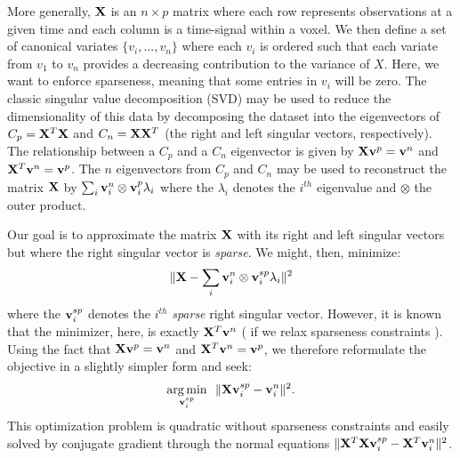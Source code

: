 \documentclass{llncs}
\newcommand{\X}{{\bf X}}
\newcommand{\vv}{{\bf v}}
\begin{document}
 
More generally, $\X$ is an $n \times p$ matrix where each row represents observations at a given time and each column is a time-signal within a voxel. We then define a set of canonical variates $\{ v_i,...,v_n\}$ where each $v_i$ is ordered such that each variate from $v_1$ to $v_n$ provides a decreasing contribution to the variance of $X$. Here, we want to enforce sparseness, meaning that some entries in $v_i$ will be zero. The classic singular value decomposition (SVD) may be used to reduce the dimensionality of this data by decomposing the dataset into the eigenvectors of $C_p = \X^T\X$ and $C_n = \X\X^T$ (the right and left singular vectors, respectively).  The relationship between a $C_p$ and a $C_n$ eigenvector is given by $\X \vv^p = \vv^n$ and $\X^T \vv^n = \vv^p$.  The $n$ eigenvectors from $C_p$ and $C_n$ may be used to reconstruct the matrix $\X$ by $\sum_i \vv^n_i \otimes \vv^p_i \lambda_i $ where the $\lambda_i$ denotes the $i^{th}$ eigenvalue and $\otimes$ the outer product.

 
Our goal is to approximate the matrix $\X$ with its right and left singular vectors but where the right singular vector is {\em sparse}.  We might, then, minimize:
\begin{eqnarray}
\label{eq:recon}
\| \X  -  \sum_i \vv^n_i \otimes \vv^{sp}_i \lambda_i  \|^2
\end{eqnarray}
where the $\vv^{sp}_i$ denotes the $i^{th}$ {\em sparse} right singular vector.  However, it is known that the minimizer, here, is exactly $\X^T \vv^n$ ( if we relax sparseness constraints ).  Using the fact that $\X \vv^p = \vv^n$ and $\X^T \vv^n = \vv^p$,  we therefore reformulate the objective in a slightly simpler form and seek:
\begin{eqnarray}
\label{eq:basic}
\underset{\vv^{sp}_i}{\operatorname{arg\,min}}~~\|  \X \vv^{sp}_i - \vv_i^n \|^2 . 
\end{eqnarray}
This optimization problem is quadratic without sparseness constraints and easily solved by conjugate gradient through the normal equations $\| \X^T\X \vv^{sp}_i - \X^T\vv_i^n \|^2$.
\end{document}
